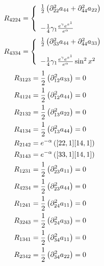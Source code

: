 \begin{align}
R_{4224}&= \left\{\begin{array}{l}
\frac{1}{2}\left( \partial^2_{22} a_{44} + \partial^2_{44} a_{22} \right)\\\\
-\frac{1}{4} \gamma _1  \frac{e^{\gamma}e^{x^1}}{e^{\alpha}}\\
\end {array}\right.\\
\end{align}
\begin{align}
R_{4334}&= \left\{\begin{array}{l}
\frac{1}{2}\left( \partial^2_{33} a_{44} + \partial^2_{44} a_{33} \right)\\\\
-\frac{1}{4} \gamma _1  \frac{e^{\gamma}e^{x^1}}{e^{\alpha}}\sin^2 x^2 \\
\end {array}\right.\\
\end{align}
\begin{align}
R_{3123}&= 
\frac{1}{2}\left( \partial^2_{12} a_{33}\right)=0\\
R_{4124}&= 
\frac{1}{2}\left( \partial^2_{12} a_{44}  \right)=0\\
R_{2132}&= 
\frac{1}{2}\left( \partial^2_{13} a_{22}  \right)=0\\
R_{4134}&= 
\frac{1}{2}\left( \partial^2_{13} a_{44} \right)=0\\
R_{2142}&= 
 e^{-\alpha}\left([22,1][14,1]\right)\\
R_{3143}&= 
e^{-\alpha}\left([33,1][14,1]\right)\\
R_{1231}&= 
\frac{1}{2}\left( \partial^2_{23} a_{11} \right)=0\\
R_{4234}&= 
\frac{1}{2}\left( \partial^2_{23} a_{44}  \right)=0\\
R_{1241}&= 
\frac{1}{2}\left( \partial^2_{24} a_{11} \right)=0\\
R_{3243}&= 
\frac{1}{2}\left( \partial^2_{24} a_{33}  \right)=0\\
R_{1341}&= 
\frac{1}{2}\left( \partial^2_{34} a_{11} \right)=0\\
R_{2342}&= 
\frac{1}{2}\left( \partial^2_{34} a_{22} \right)=0
\end{align}

